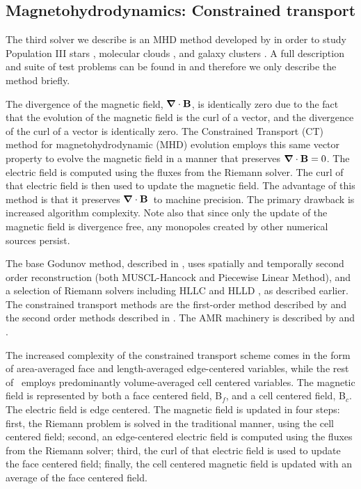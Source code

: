 \subsection{Magnetohydrodynamics: Constrained transport}
\label{sec.num.mhd-ct}
\def\Bvec{{\bf B}}
\def\Bf{Bf}
\def\Bc{Bc}
\def\Evec{{\bf E}}
\def\Divb{\ensuremath{\div \Bvec}}

The third solver we describe is an MHD method developed by 
\citet{Collins10} in order to study Population
III stars \citep{Xu08}, molecular clouds \citep{Collins12a}, and galaxy clusters
\citep{Xu12, Skillman13}.  A full description and suite of test problems can be
found in \citet{Collins10} and therefore we only describe the method briefly.

The divergence of the magnetic field, \Divb, is
identically zero due to the fact that the evolution of the magnetic field is the
curl of a vector, and the divergence of the curl of a vector is identically
zero.
The Constrained Transport (CT) method \citep{Evans88, Balsara99} for
magnetohydrodynamic (MHD) evolution employs this same vector property
to evolve the magnetic field in a manner that preserves $\Divb=0$.  
The electric field is computed using
the fluxes from the Riemann solver.  The curl of that electric field
is then used to update the magnetic field.  The advantage of this
method is that it preserves \Divb\ to machine precision.  The primary
drawback is increased algorithm complexity.  Note also that since 
only the update of the magnetic field is divergence free, any monopoles 
created by other numerical sources persist.

The base Godunov method, described in \citet{Li08a}, uses spatially and
temporally second order reconstruction (both MUSCL-Hancock and
Piecewise Linear Method), and a selection of Riemann solvers including
HLLC and HLLD \citep{Mignone07}, as described earlier.  
The constrained transport methods
are the first-order method described by \citet{Balsara99} and the
second order methods described in \citet{Gardiner05}.  The AMR
machinery is described by \citet{Balsara01} and \citet{Collins10}.

The increased complexity of the constrained transport scheme comes in
the form of area-averaged face and length-averaged edge-centered
variables, while the rest of \enzo\ employs predominantly
volume-averaged cell centered variables.  The magnetic field is
represented by both a face centered field, B$_f$, and a cell centered
field, B$_c$.  The electric field is edge centered.  The magnetic
field is updated in four steps: first, the Riemann problem is solved
in the traditional manner, using the cell centered field; second, an
edge-centered electric field is computed using the fluxes from the
Riemann solver; third, the curl of that electric field is used to
update the face centered field; finally, the cell centered magnetic
field is updated with an average of the face centered field.

